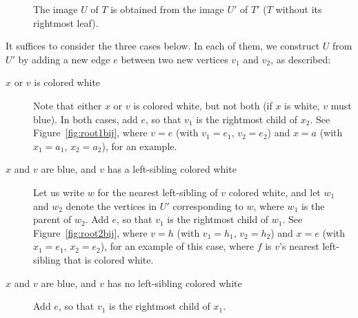 \documentclass[12pt]{amsart}
\begin{document}
\begin{description}
\begin{figure}[htbp]
\begin{tikzpicture}[scale=0.85]
        \end{tikzpicture}
        \caption{The image $U$ of $T$ is obtained from the image $U'$ of $T'$ ($T$ without its rightmost leaf).}
        \label{fig:TU'}
    \end{figure}
    
    It suffices to consider the three cases below. In each of them, we construct $U$ from $U'$ by adding a new edge $e$ between two new vertices $v_1$ and $v_2$, as described:
    \begin{description}
        \item[$x$ or $v$ is colored white] Note that either $x$ or $v$ is colored white, but not both (if $x$ is white, $v$ must blue). In both cases, add $e$, so that $v_1$ is the rightmost child of $x_2$.
        See Figure~\ref{fig:root1bij}, where $v=e$ (with $v_1=e_1$, $v_2=e_2$) and $x=a$ (with $x_1=a_1$, $x_2=a_2$), for an example.
        \item[$x$ and $v$ are blue, and $v$ has a left-sibling colored white] Let us write $w$ for the nearest left-sibling of $v$ colored white, and let $w_1$ and $w_2$ denote the vertices in $U'$ corresponding to $w$, where $w_1$ is the parent of $w_2$. Add $e$, so that $v_1$ is the rightmost child of $w_1$. See Figure~\ref{fig:root2bij}, where $v=h$ (with $v_1=h_1$, $v_2=h_2$) and $x=e$ (with $x_1=e_1$, $x_2=e_2$), for an example of this case, where $f$ is $v$'s nearest left-sibling that is colored white.        
        \item[$x$ and $v$ are blue, and $v$ has no left-sibling colored white] Add $e$, so that $v_1$ is the rightmost child of $x_1$.
        
    \end{description}
    
    
    \begin{figure}[htbp]
\end{figure}
\end{description}
\end{document}
